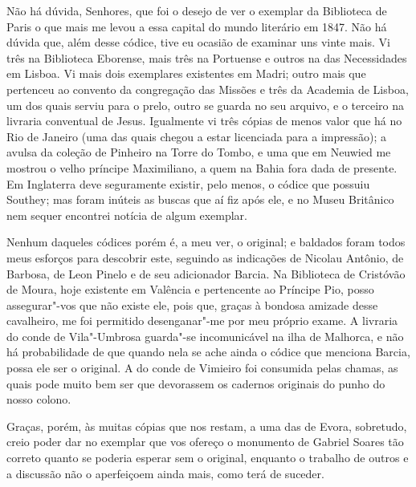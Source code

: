 Não há dúvida, Senhores, que foi o desejo de ver o exemplar da 
Biblioteca de Paris o que mais me levou a essa capital do mundo 
literário em 1847. Não há dúvida que, além desse códice, tive eu ocasião 
de examinar uns vinte mais. Vi três na Biblioteca Eborense, mais três na 
Portuense e outros na das Necessidades em Lisboa. Vi mais dois 
exemplares existentes em Madri; outro mais que pertenceu ao convento 
da congregação das Missões e três da Academia de Lisboa, um dos 
quais serviu para o prelo, outro se guarda no seu arquivo, e o terceiro na 
livraria conventual de Jesus. Igualmente vi três cópias de menos valor 
que há no Rio de Janeiro (uma das quais chegou a estar licenciada para a 
impressão); a avulsa da coleção de Pinheiro na Torre do Tombo, e uma 
que em Neuwied me mostrou o velho príncipe Maximiliano, a quem na 
Bahia fora dada de presente. Em Inglaterra deve seguramente existir, 
pelo menos, o códice que possuiu Southey; mas foram inúteis as buscas 
que aí fiz após ele, e no Museu Britânico nem sequer encontrei notícia 
de algum exemplar.

Nenhum daqueles códices porém é, a meu ver, o original; e 
baldados foram todos meus esforços para descobrir este, seguindo as 
indicações de Nicolau Antônio, de Barbosa, de Leon Pinelo e de seu 
adicionador Barcia. Na Biblioteca de Cristóvão de Moura, hoje existente 
em Valência e pertencente ao Príncipe Pio, posso assegurar"-vos que não 
existe ele, pois que, graças à bondosa amizade desse cavalheiro, me foi 
permitido desenganar"-me por meu próprio exame. A livraria do conde 
de Vila"-Umbrosa guarda"-se incomunicável na ilha de Malhorca, e não 
há probabilidade de que quando nela se ache ainda o códice que 
menciona Barcia, possa ele ser o original. A do conde de Vimieiro foi 
consumida pelas chamas, as quais pode muito bem ser que devorassem 
os cadernos originais do punho do nosso colono.

Graças, porém, às muitas cópias que nos restam, a uma das de 
Evora, sobretudo, creio poder dar no exemplar que vos ofereço o 
monumento de Gabriel Soares tão correto quanto se poderia esperar sem 
o original, enquanto o trabalho de outros e a discussão não o 
aperfeiçoem ainda mais, como terá de suceder.

